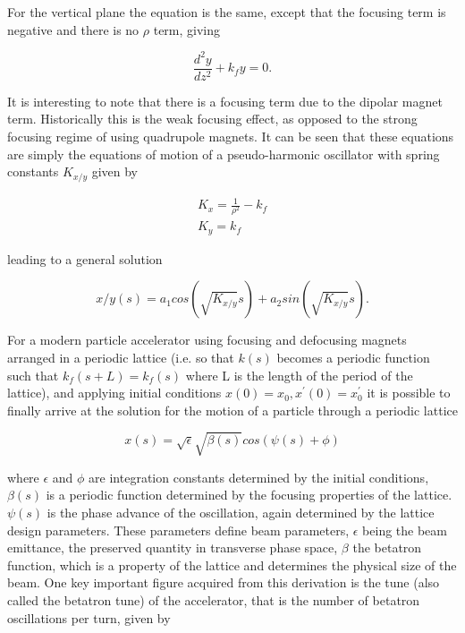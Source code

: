 For the vertical plane the equation is the same, except that the focusing term is negative and there is no $\rho$ term, giving

\begin{equation}
\frac{d^{2}y}{dz^{2}} +  k_{f} y  = 0.
\label{eqn:vert-eqn-motion}
\end{equation}

It is interesting to note that there is a focusing term due to the dipolar magnet term. Historically this is the weak focusing effect, as opposed to the strong focusing regime of using quadrupole magnets. It can be seen that these equations are simply the equations of motion of a pseudo-harmonic oscillator with spring constants $K_{x/y}$ given by

\begin{align*}
K_{x} = \frac{1}{\rho^{2}} - k_{f} \\
K_{y} = k_{f}
\end{align*}

leading to a general solution 

\begin{equation}
x/y \left( s \right) = a_{1} cos \left( \sqrt{K_{x/y}} s \right) + a_{2} sin \left( \sqrt{K_{x/y}} s \right).
\end{equation}

For a modern particle accelerator using focusing and defocusing magnets arranged in a periodic lattice (i.e. so that $k(s)$ becomes a periodic function such that $k_{f}(s+L) = k_{f}(s)$ where L is the length of the period of the lattice), and applying initial conditions $x(0) = x_{0}, x^{'}(0) = x^{'}_{0}$ it is possible to finally arrive at the solution for the motion of a particle through a periodic lattice

\begin{equation}
x \left( s \right) = \sqrt{\epsilon} \sqrt{\beta \left( s \right) } cos \left( \psi \left( s \right) + \phi \right)
\end{equation}

where $\epsilon$ and $\phi$ are integration constants determined by the initial conditions, $\beta (s)$ is a periodic function determined by the focusing properties of the lattice. $ \psi (s)$ is the phase advance of the oscillation, again determined by the lattice design parameters. These parameters define beam parameters, $\epsilon$ being the beam emittance, the preserved quantity in transverse phase space, $\beta$ the betatron function, which is a property of the lattice and determines the physical size of the beam. One key important figure acquired from this derivation is the tune (also called the betatron tune) of the accelerator, that is the number of betatron oscillations per turn, given by

